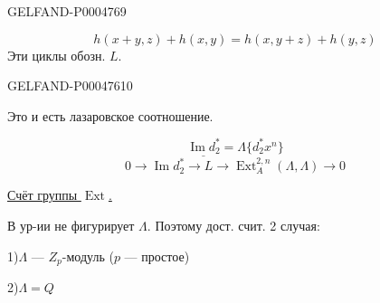 \begin{GelfandAdjacentEvidence}{GELFAND-P000476}{9}


\[
\boxed{h(x+y,z)+h(x,y)=h(x,y+z)+h(y,z)}
\]
Эти циклы обозн. $L$.
\end{GelfandAdjacentEvidence}
\begin{GelfandAdjacentEvidence}{GELFAND-P000476}{10}


Это и есть лазаровское соотношение.
\end{GelfandAdjacentEvidence}


\[
\underline{\operatorname{Im}d_2^*}=\Lambda\{d_2^*x^n\}
\]
\[
0\longrightarrow\operatorname{Im}d_2^*\longrightarrow L
\longrightarrow\operatorname{Ext}_A^{2,n}(\Lambda,\Lambda)\longrightarrow0
\]

\uline{Счёт группы \mbox{$\operatorname{Ext}$}.}

В ур-ии не фигурирует $\Lambda$. Поэтому дост. счит. 2 случая:

1)\quad $\Lambda$ — $Z_p$-модуль ($p$ — простое)

2)\quad $\Lambda=Q$


